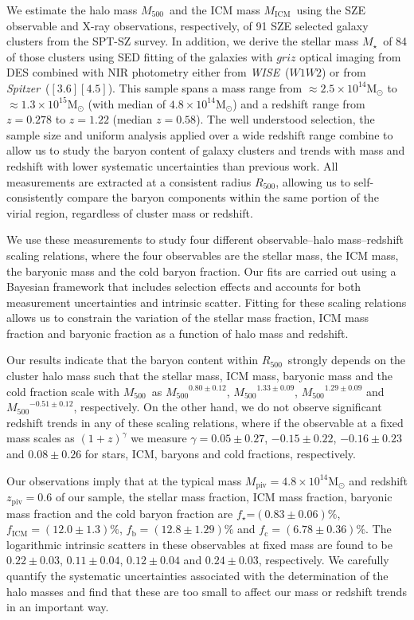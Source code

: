 \documentclass[useAMS,usenatbib,iop,numberedappendix]{mn2e}
\newcommand{\Msun}{\ensuremath{\mathrm{M}_{\odot}}}
\newcommand{\Rfiveoo}{\ensuremath{R_{500}}}
\newcommand{\Mfiveoo}{\ensuremath{M_{500}}}
\newcommand{\redshift}{\ensuremath{z}}
\newcommand{\Spitzer}{\emph{Spitzer}}
\newcommand{\WISE}{\emph{WISE}}
\newcommand{\Mstar}{\ensuremath{M_{\star}}}
\newcommand{\Mgas}{\ensuremath{M_{\mathrm{ICM}}}}
\newcommand{\IRACone}{\ensuremath{[3.6]}}
\newcommand{\IRACtwo}{\ensuremath{[4.5]}}
\newcommand{\Wone}{\ensuremath{W1}}
\newcommand{\Wtwo}{\ensuremath{W2}}
\newcommand{\MPIV}{\ensuremath{M_{\mathrm{piv}}}}
\newcommand{\ZPIV}{\ensuremath{z_{\mathrm{piv}}}}
\newcommand{\fstar}{\ensuremath{f_{\star}}}
\newcommand{\fgas}{\ensuremath{f_{\mathrm{ICM}}}}
\newcommand{\fcold}{\ensuremath{f_{\mathrm{c}}}}
\newcommand{\fbary}{\ensuremath{f_{\mathrm{b}}}}
\newcommand{\percent}{\ensuremath{\%}}
\newcommand{\numBstaronezsys}{\ensuremath{0.80\pm0.12}}
\newcommand{\numCstaronezsys}{\ensuremath{0.05\pm0.27}}
\newcommand{\numDstaronezsys}{\ensuremath{0.22\pm0.03}}
\newcommand{\numBgasonezsys}{\ensuremath{1.33\pm0.09}}
\newcommand{\numCgasonezsys}{\ensuremath{-0.15\pm0.22}}
\newcommand{\numDgasonezsys}{\ensuremath{0.11\pm0.04}}
\newcommand{\numBbaryonezsys}{\ensuremath{1.29\pm0.09}}
\newcommand{\numCbaryonezsys}{\ensuremath{-0.16\pm0.23}}
\newcommand{\numDbaryonezsys}{\ensuremath{0.12\pm0.04}}
\newcommand{\numAcoldonezsys}{\ensuremath{6.78\pm0.36}}
\newcommand{\numBcoldonezsys}{\ensuremath{-0.51\pm0.12}}
\newcommand{\numCcoldonezsys}{\ensuremath{0.08\pm0.26}}
\newcommand{\numDcoldonezsys}{\ensuremath{0.24\pm0.03}}
\begin{document}
We estimate the halo mass \Mfiveoo\ and the ICM mass \Mgas\ using the SZE observable and X-ray observations, respectively, of 91 SZE selected galaxy clusters from the SPT-SZ survey.  In addition, we derive the stellar mass \Mstar\ of 84 of those clusters using SED fitting of the galaxies with $griz$ optical imaging from DES combined with NIR photometry either from \WISE\ (\Wone\Wtwo) or from \Spitzer\ (\IRACone\IRACtwo).  This sample spans a mass range from $\approx2.5\times10^{14}\Msun$ to $\approx1.3\times10^{15}\Msun$ (with median of $4.8\times10^{14}\Msun$) and a redshift range from $\redshift=0.278$ to $\redshift=1.22$ (median $\redshift=0.58$).
The well understood selection, the sample size and uniform analysis applied over a wide redshift range combine to allow us to study the baryon content of galaxy clusters and trends with mass and redshift with lower systematic uncertainties than previous work.  All measurements are extracted at a consistent radius \Rfiveoo, allowing us to self-consistently compare the baryon components within the same portion of the virial region, regardless of cluster mass or redshift.

We use these measurements to study four different observable--halo mass--redshift scaling relations, where the four observables are the stellar mass, the ICM mass, the baryonic mass and the cold baryon fraction.  Our fits are carried out using a Bayesian framework that includes selection effects and accounts for both measurement uncertainties and intrinsic scatter.  Fitting for these scaling relations allows us to constrain the variation of the stellar mass fraction, ICM mass fraction and baryonic fraction as a function of halo mass and redshift.  

Our results indicate that the baryon content within \Rfiveoo\ strongly depends on the cluster halo mass such that the stellar mass, ICM mass, baryonic mass and the cold fraction scale with \Mfiveoo\ as ${\Mfiveoo}^{\numBstaronezsys}$, ${\Mfiveoo}^{\numBgasonezsys}$, ${\Mfiveoo}^{\numBbaryonezsys}$ and ${\Mfiveoo}^{\numBcoldonezsys}$, respectively.
On the other hand, we do not observe significant redshift trends in any of these scaling relations, where if the observable at a fixed mass scales as $(1+z)^\gamma$ we measure $\gamma=\numCstaronezsys$, $\numCgasonezsys$, $\numCbaryonezsys$ and $\numCcoldonezsys$ for stars, ICM, baryons and cold fractions, respectively.

Our observations imply that at the 
typical mass $\MPIV = 4.8\times10^{14}\Msun$ and redshift $\ZPIV=0.6$ of our sample, the stellar mass fraction, ICM mass fraction, baryonic mass fraction and the cold baryon fraction are  
\fstar=$(0.83\pm0.06)\percent$,
$\fgas=(12.0\pm1.3)\percent$,  
$\fbary=(12.8\pm1.29)\percent$ and
$\fcold=(\numAcoldonezsys)$\percent. 
The logarithmic intrinsic scatters in these observables at fixed mass are found to be
$\numDstaronezsys$,
$\numDgasonezsys$,
$\numDbaryonezsys$ and
$\numDcoldonezsys$, respectively.
We carefully quantify the systematic uncertainties associated with the determination of the halo masses and find that these are too small to affect our mass or redshift trends in an important way.  
\end{document}
